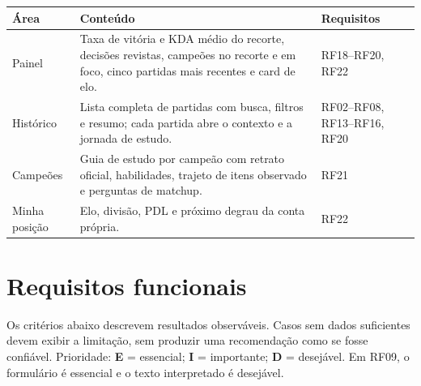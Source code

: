 \documentclass[12pt,a4paper]{article}
\begin{document}
\begin{center}
\begin{tabular}{@{}p{2.9cm}p{8.4cm}p{2.4cm}@{}}
\toprule
\bfseries Área & \bfseries Conteúdo & \bfseries Requisitos \\
\midrule
Painel & Taxa de vitória e KDA médio do recorte, decisões revistas, campeões no recorte e em foco, cinco partidas mais recentes e card de elo. & RF18--RF20, RF22 \\
Histórico & Lista completa de partidas com busca, filtros e resumo; cada partida abre o contexto e a jornada de estudo. & RF02--RF08, RF13--RF16, RF20 \\
Campeões & Guia de estudo por campeão com retrato oficial, habilidades, trajeto de itens observado e perguntas de matchup. & RF21 \\
Minha posição & Elo, divisão, PDL e próximo degrau da conta própria. & RF22 \\
\bottomrule
\end{tabular}
\end{center}

\section{Requisitos funcionais}
Os critérios abaixo descrevem resultados observáveis. Casos sem dados suficientes devem
exibir a limitação, sem produzir uma recomendação como se fosse confiável. Prioridade:
\textbf{E} = essencial; \textbf{I} = importante; \textbf{D} = desejável. Em RF09, o formulário é essencial e o texto interpretado é desejável.
\end{document}
